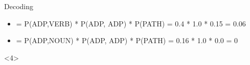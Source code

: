 \documentclass{beamer}
\begin{document}
\begin{frame}{Decoding}
\begin{center}
\begin{onlyenv}

{\small
\begin{itemize}
  \item = P(ADP,VERB) * P(ADP, ADP) * P(PATH) = 0.4 * 1.0 * 0.15 = 0.06
  \item = P(ADP,NOUN) * P(ADP, ADP) * P(PATH) = 0.16 * 1.0 * 0.0 = 0
\end{itemize}
}

\end{onlyenv}


\begin{onlyenv}<4>


\end{onlyenv}
\end{center}
\end{frame}
\end{document}
